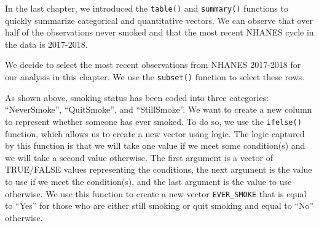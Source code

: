 \documentclass[
  letterpaper,
]{krantz}
\makeatletter
\newenvironment{Shaded}{\begin{snugshade}}{\end{snugshade}}
\newcommand{\CommentTok}[1]{\textcolor[rgb]{0.37,0.37,0.37}{#1}}
\newcommand{\DecValTok}[1]{\textcolor[rgb]{0.68,0.00,0.00}{#1}}
\newcommand{\FunctionTok}[1]{\textcolor[rgb]{0.28,0.35,0.67}{#1}}
\newcommand{\NormalTok}[1]{\textcolor[rgb]{0.00,0.23,0.31}{#1}}
\newcommand{\OtherTok}[1]{\textcolor[rgb]{0.00,0.23,0.31}{#1}}
\newcommand{\SpecialCharTok}[1]{\textcolor[rgb]{0.37,0.37,0.37}{#1}}
\newenvironment{kframe}{%
\medskip{}
\setlength{\fboxsep}{.8em}
 \def\at@end@of@kframe{}%
 \ifinner\ifhmode%
  \def\at@end@of@kframe{\end{minipage}}%
  \begin{minipage}{\columnwidth}%
 \fi\fi%
 \def\FrameCommand##1{\hskip\@totalleftmargin \hskip-\fboxsep
 \colorbox{shadecolor}{##1}\hskip-\fboxsep
     \hskip-\linewidth \hskip-\@totalleftmargin \hskip\columnwidth}%
 \MakeFramed {\advance\hsize-\width
   \@totalleftmargin\z@ \linewidth\hsize
   \@setminipage}}%
 {\par\unskip\endMakeFramed%
 \at@end@of@kframe}
\renewenvironment{Shaded}{\begin{kframe}}{\end{kframe}}
\makeatother
\begin{document}
In the last chapter, we introduced the \texttt{table()} and
\texttt{summary()} functions to quickly summarize categorical and
quantitative vectors. We can observe that over half of the observations
never smoked and that the most recent NHANES cycle in the data is
2017-2018.

\begin{Shaded}
\end{Shaded}

We decide to select the most recent observations from NHANES 2017-2018
for our analysis in this chapter. We use the \texttt{subset()} function
to select these rows.

\begin{Shaded}
\end{Shaded}

As shown above, smoking status has been coded into three categories:
``NeverSmoke'', ``QuitSmoke'', and ``StillSmoke''. We want to create a
new column to represent whether someone has ever smoked. To do so, we
use the \texttt{ifelse()} function, which allows us to create a new
vector using logic. The logic captured by this function is that we will
take one value if we meet some condition(s) and we will take a second
value otherwise. The first argument is a vector of TRUE/FALSE values
representing the conditions, the next argument is the value to use if we
meet the condition(s), and the last argument is the value to use
otherwise. We use this function to create a new vector
\texttt{EVER\_SMOKE} that is equal to ``Yes'' for those who are either
still smoking or quit smoking and equal to ``No'' otherwise.
\end{document}
